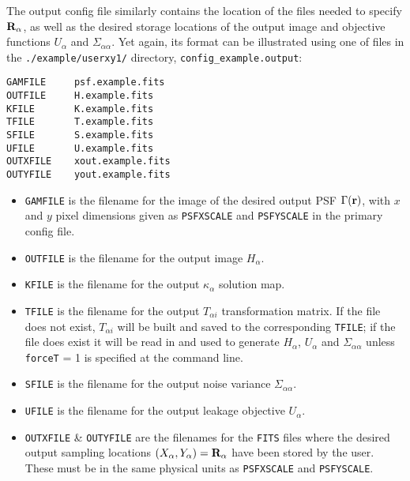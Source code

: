 \documentclass[10pt]{article}
\begin{document}
The output config file similarly contains the location of the files needed to specify ${\bf R}_{\alpha}$, as well as the desired storage locations of the output image and objective functions $U_{\alpha}$ and $\Sigma_{\alpha \alpha}$.  Yet again, its format can be illustrated using one of files in the \texttt{./example/userxy1/} directory, \texttt{config\_example.output}:

\texttt{GAMFILE~~~~~psf.example.fits \\
OUTFILE~~~~~H.example.fits \\
KFILE~~~~~~~K.example.fits \\
TFILE~~~~~~~T.example.fits \\
SFILE~~~~~~~S.example.fits \\
UFILE~~~~~~~U.example.fits \\
OUTXFILE~~~~xout.example.fits \\
OUTYFILE~~~~yout.example.fits}

\begin{itemize}
\item \texttt{GAMFILE} is the filename for the image of the desired output PSF $\Gamma({\bf r})$, with $x$ and $y$ pixel dimensions given as \texttt{PSFXSCALE} and \texttt{PSFYSCALE} in the primary config file.
\item \texttt{OUTFILE} is the filename for the output image $H_{\alpha}$.
\item \texttt{KFILE} is the filename for the output $\kappa_{\alpha}$ solution map.
\item \texttt{TFILE} is the filename for the output $T_{\alpha i}$ transformation matrix.   If the file does not exist, $T_{\alpha i}$ will be built and saved to the corresponding \texttt{TFILE}; if the file does exist it will be read in and used to generate $H_{\alpha}$, $U_{\alpha}$ and $\Sigma_{\alpha \alpha}$ unless \texttt{forceT} = 1 is specified at the command line.
\item \texttt{SFILE} is the filename for the output noise variance $\Sigma_{\alpha \alpha}$.
\item \texttt{UFILE} is the filename for the output leakage objective $U_{\alpha}$.
\item \texttt{OUTXFILE} \& \texttt{OUTYFILE} are the filenames for the \texttt{FITS} files where the desired output sampling locations $(X_{\alpha}, Y_{\alpha}) = {\bf R}_{\alpha}$ have been stored by the user. These must be in the same physical units as \texttt{PSFXSCALE} and \texttt{PSFYSCALE}.
\end{itemize}
\end{document}
